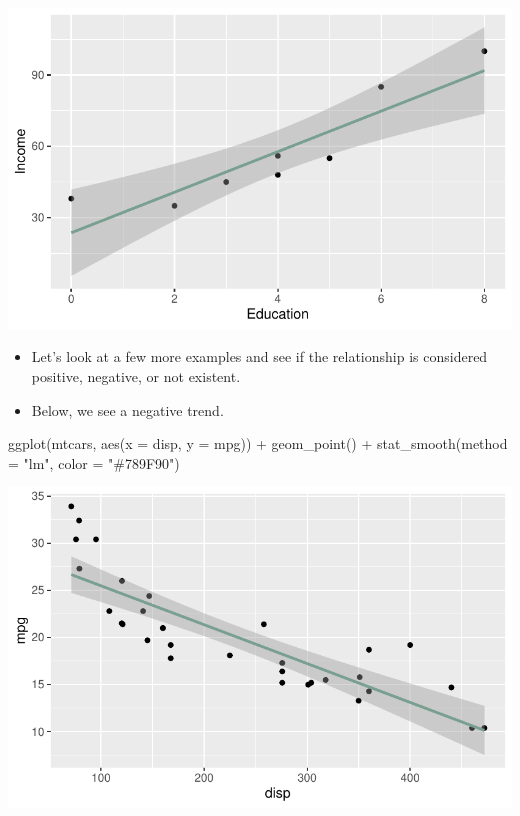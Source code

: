 \documentclass[
  letterpaper,
  DIV=11,
  numbers=noendperiod]{scrreprt}
\newenvironment{Shaded}{\begin{snugshade}}{\end{snugshade}}
\newcommand{\AttributeTok}[1]{\textcolor[rgb]{0.40,0.45,0.13}{#1}}
\newcommand{\FunctionTok}[1]{\textcolor[rgb]{0.28,0.35,0.67}{#1}}
\newcommand{\NormalTok}[1]{\textcolor[rgb]{0.00,0.23,0.31}{#1}}
\newcommand{\SpecialCharTok}[1]{\textcolor[rgb]{0.37,0.37,0.37}{#1}}
\newcommand{\StringTok}[1]{\textcolor[rgb]{0.13,0.47,0.30}{#1}}
\providecommand{\tightlist}{%
  \setlength{\itemsep}{0pt}\setlength{\parskip}{0pt}}\usepackage{longtable,booktabs,array}
\begin{document}
\includegraphics{dataviz_files/figure-pdf/unnamed-chunk-50-1.pdf}

\begin{itemize}
\tightlist
\item
  Let's look at a few more examples and see if the relationship is
  considered positive, negative, or not existent.
\item
  Below, we see a negative trend.
\end{itemize}

\begin{Shaded}
\begin{Highlighting}[]
\FunctionTok{ggplot}\NormalTok{(mtcars, }\FunctionTok{aes}\NormalTok{(}\AttributeTok{x =}\NormalTok{ disp, }\AttributeTok{y =}\NormalTok{ mpg)) }\SpecialCharTok{+} \FunctionTok{geom\_point}\NormalTok{() }\SpecialCharTok{+} \FunctionTok{stat\_smooth}\NormalTok{(}\AttributeTok{method =} \StringTok{"lm"}\NormalTok{,}
    \AttributeTok{color =} \StringTok{"\#789F90"}\NormalTok{)}
\end{Highlighting}
\end{Shaded}

\includegraphics{dataviz_files/figure-pdf/unnamed-chunk-51-1.pdf}
\end{document}

